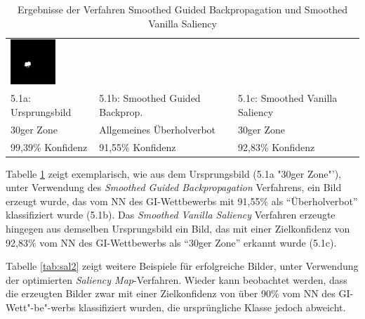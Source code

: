 \begin{table}
\begin{tabular}{p{4.5cm}p{4.5cm}p{4.5cm}}
		\includegraphics[width=\linewidth]{Images/AnPe/5_1_Rechts}\\ 
		5.1a: Ursprungsbild &5.1b: Smoothed Guided Backprop. &5.1c: Smoothed Vanilla Saliency \\
		30ger Zone & Allgemeines Überholverbot & 30ger Zone\\
		99,39\% Konfidenz & 91,55\% Konfidenz & 92,83\% Konfidenz\\
		
	\end{tabular} 

	\caption{Ergebnisse der Verfahren Smoothed Guided Backpropagation und Smoothed Vanilla Saliency}
	\label{tab:sal1}
\end{table}

Tabelle \ref{tab:sal1} zeigt exemplarisch, wie aus dem Ursprungsbild (5.1a "30ger Zone"'), unter Verwendung des \textit{Smoothed Guided Backpropagation} Verfahrens, ein Bild erzeugt wurde, das vom \ac{NN} des \ac{GI}-Wettbewerbs mit 91,55\% als "`Überholverbot"' klassifiziert wurde (5.1b). 
Das \textit{Smoothed Vanilla Saliency} Verfahren erzeugte hingegen aus demselben Ursprungsbild ein Bild, das mit einer Zielkonfidenz von 92,83\% vom \ac{NN} des \ac{GI}-Wettbewerbs als "`30ger Zone"' erkannt wurde (5.1c).

Tabelle \ref{tab:sal2} zeigt weitere Beispiele für erfolgreiche Bilder, unter Verwendung der optimierten \textit{Saliency Map}-Verfahren. 
Wieder kann beobachtet werden, dass die erzeugten Bilder zwar mit einer Zielkonfidenz von über 90\% vom \ac{NN} des \ac{GI}-Wett"-be"-werbs klassifiziert wurden, die ursprüngliche Klasse jedoch abweicht.

